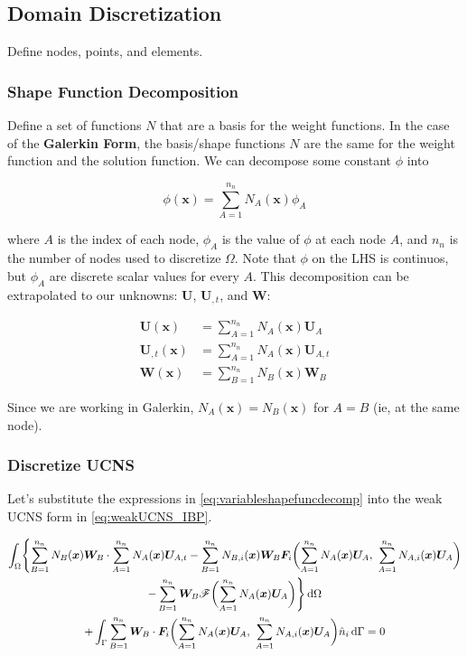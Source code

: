 \documentclass[12pt, letterpaper, twoside]{article}
\renewcommand{\vec}[1]{\bm{#1}}
\newcommand{\U}{\vec{U}}
\newcommand{\F}{\vec{F}}
\newcommand{\W}{\vec{W}}
\newcommand{\x}{\vec{x}}
\newcommand{\NAx}{N_A(\x)}
\newcommand{\NBx}{N_B(\x)}
\newcommand{\NAix}{N_{A,i}(\x)}
\newcommand{\NBix}{N_{B,i}(\x)}
\newcommand{\sumA}[1]{\sum_{A=1}^{#1}}
\newcommand{\sumB}[1]{\sum_{B=1}^{#1}}
\newcommand{\src}{\vec{\mathscr{F}}}
\begin{document}
    \subsection{Domain Discretization}
        Define nodes, points, and elements. 

        \subsubsection{Shape Function Decomposition}
        Define a set of functions \(N\) that are a basis for the weight functions. In the case of the \textbf{Galerkin Form}, the basis/shape functions \(N\) are the same for the weight function and the solution function. We can decompose some constant \(\phi\) into

        \begin{equation}
            \phi(\x) = \sum_{A=1}^{n_n} N_A(\x) \phi_A
        \end{equation}

        where \(A\) is the index of each node, \(\phi_A\) is the value of \(\phi\) at each node \(A\), and \(n_n\) is the number of nodes used to discretize \(\Omega\). Note that \(\phi\) on the LHS is continuos, but \(\phi_A\) are discrete scalar values for every \(A\). This decomposition can be extrapolated to our unknowns: \(\U\), \(\U_{,t}\), and \(\W\):

        \begin{subequations}
            \label{eq:variableshapefuncdecomp}
           \begin{align}
                \U(\x) &= \sum_{A=1}^{n_n} N_A(\x) \U_A \\
                \U_{,t}(\x) &= \sum_{A=1}^{n_n} N_A(\x) \U_{A,t} \\
                \W(\x) &= \sum_{B=1}^{n_n} N_B(\x) \W_B 
           \end{align} 
        \end{subequations}

        Since we are working in Galerkin, \(N_A(\x) = N_B(\x) \) for \(A=B\) (ie, at the same node). 

        \subsubsection{Discretize UCNS}
            Let's substitute the expressions in \cref{eq:variableshapefuncdecomp} into the weak UCNS form in \cref{eq:weakUCNS_IBP}.

            \begin{multline}
                \int_\Omega \Biggl\{ \sumB{n_n} \NBx \W_B \cdot \sumA{n_n} \NAx \U_{A,t} 
                - \sumB{n_n} \NBix \W_B \F_i \biggl(\sumA{n_n} \NAx \U_A,\ \sumA{n_n} \NAix \U_A\biggr) \\
                - \sumB{n_n} \W_B \src\biggl(\sumA{n_n} \NAx \U_A \biggr) \Biggr\} \dif \Omega \\
                + \int_\Gamma \sumB{n_n} \W_B \cdot \F_i\biggl(\sumA{n_n} \NAx \U_A,\ \sumA{n_n} \NAix \U_A\biggr) \hat n_i \dif \Gamma = 0
            \end{multline}
\end{document}
